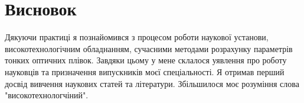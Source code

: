 \documentclass[a4paper, 14pt]{extarticle}
\begin{document}
\newpage

\section{Висновок}
Дякуючи практиці я познайомився з процесом роботи наукової установи, високотехнологічним обладнанням, сучасними методами розрахунку параметрів тонких оптичних плівок. Завдяки цьому у мене склалося уявлення про роботу науковців та призначення випускників моєї спеціальності. Я отримав перший досвід вивчення наукових статей та літератури. Збільшилося моє розуміння слова "високотехнологчіний".
\end{document}
